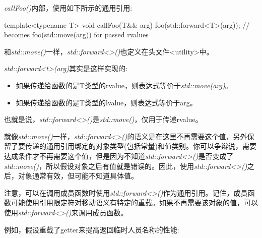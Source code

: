 \textit{callFoo()}内部，使用如下所示的通用引用:\par

\begin{codebox}[cpp]
template<typename T>
void callFoo(T&& arg) {
  foo(std::forward<T>(arg)); // becomes foo(std::move(arg)) for passed rvalues
}
\end{codebox}

和\textit{std::move()}一样，\textit{std::\allowbreak{}forward<\allowbreak{}>(\allowbreak{})\allowbreak{}}也定义在头文件<utility>中。\par

\textit{std::\allowbreak{}forward<\allowbreak{}t>(\allowbreak{}arg)\allowbreak{}}其实是这样实现的:\par

\begin{itemize}
  \item 如果传递给函数的是T类型的rvalue，则表达式等价于\textit{std::\allowbreak{}move(\allowbreak{}arg)\allowbreak{}}。
  \item 如果传递给函数的是T类型的lvalue，则表达式等价于arg。
\end{itemize}

也就是说，\textit{std::\allowbreak{}forward<\allowbreak{}>(\allowbreak{})\allowbreak{}}是\textit{std::move()}，仅用于传递rvalue。\par

就像\textit{std::move()}一样，\textit{std::\allowbreak{}forward<\allowbreak{}>(\allowbreak{})\allowbreak{}}的语义是在这里不再需要这个值，另外保留了要传递的通用引用绑定的对象类型(包括常量)和值类别。你可以争辩说，需要达成条件才不再需要这个值，但是因为不知道\textit{std::\allowbreak{}forward<\allowbreak{}>(\allowbreak{})\allowbreak{}}是否变成了\textit{std::move()}，所以假设对象之后有值就是错误的。因此，使用\textit{std::\allowbreak{}forward<\allowbreak{}>(\allowbreak{})\allowbreak{}}之后，对象通常有效，但可能不知道具体值。\par


注意，可以在调用成员函数时使用\textit{std::\allowbreak{}forward<\allowbreak{}>(\allowbreak{})\allowbreak{}}作为通用引用。记住，成员函数可能使用引用限定符对移动语义有特定的重载。如果不再需要该对象的值，可以使用\textit{std::\allowbreak{}forward<\allowbreak{}>(\allowbreak{})\allowbreak{}}来调用成员函数。\par

例如，假设重载了getter来提高返回临时人员名称的性能:\par

